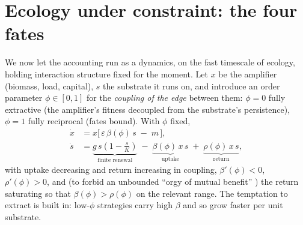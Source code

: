 \documentclass[11pt]{article}
\theoremstyle{plain}
\theoremstyle{definition}
\begin{document}
\section{Ecology under constraint: the four fates}
\label{sec:fates}

We now let the accounting run as a dynamics, on the fast timescale of ecology, holding interaction structure fixed for the moment. Let $x$ be the amplifier (biomass, load, capital), $s$ the substrate it runs on, and introduce an order parameter $\phi \in [0,1]$ for the \emph{coupling of the edge} between them: $\phi = 0$ fully extractive (the amplifier's fitness decoupled from the substrate's persistence), $\phi = 1$ fully reciprocal (fates bound). With $\phi$ fixed,
\begin{align}
\dot x &= x\big[\,\varepsilon\,\beta(\phi)\,s \;-\; m\,\big], \label{eq:xdot}\\[2pt]
\dot s &= \underbrace{g\,s\!\left(1-\tfrac{s}{K}\right)}_{\text{finite renewal}} \;-\; \underbrace{\beta(\phi)\,x\,s}_{\text{uptake}} \;+\; \underbrace{\rho(\phi)\,x\,s}_{\text{return}}, \label{eq:sdot}
\end{align}
with uptake decreasing and return increasing in coupling, $\beta'(\phi) < 0$, $\rho'(\phi) > 0$, and (to forbid an unbounded ``orgy of mutual benefit'' \cite{may1974mutualism}) the return saturating so that $\beta(\phi) > \rho(\phi)$ on the relevant range. The temptation to extract is built in: low-$\phi$ strategies carry high $\beta$ and so grow faster per unit substrate.
\end{document}
